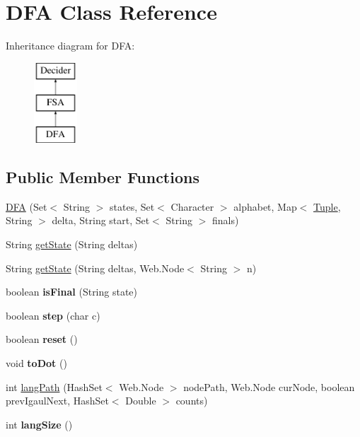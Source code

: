 \hypertarget{class_d_f_a}{}\section{D\+FA Class Reference}
\label{class_d_f_a}
Inheritance diagram for D\+FA\+:\begin{figure}[H]
\begin{center}
\leavevmode
\includegraphics[height=3.000000cm]{class_d_f_a}
\end{center}
\end{figure}
\subsection*{Public Member Functions}
\begin{DoxyCompactItemize}
\item 
\mbox{\hyperlink{class_d_f_a_a2dac22724db342b9f981318325f99f0e}{D\+FA}} (Set$<$ String $>$ states, Set$<$ Character $>$ alphabet, Map$<$ \mbox{\hyperlink{class_tuple}{Tuple}}, String $>$ delta, String start, Set$<$ String $>$ finals)
\item 
String \mbox{\hyperlink{class_d_f_a_a77e6a5e4aa6f18671a8e4534735ede72}{get\+State}} (String deltas)
\item 
String \mbox{\hyperlink{class_d_f_a_a3ed33d3f6ca27d723d8357c0aa44b362}{get\+State}} (String deltas, Web.\+Node$<$ String $>$ n)
\item 
\mbox{\label{class_d_f_a_ad565130d28a1ed9ddfbd4e3df6791e8a}} 
boolean {\bfseries is\+Final} (String state)
\item 
\mbox{\label{class_d_f_a_a676dcfeea9da5d2db9334d92de04854d}} 
boolean {\bfseries step} (char c)
\item 
\mbox{\label{class_d_f_a_af214bd9d0f7b409f51d9c75231a35d8a}} 
boolean {\bfseries reset} ()
\item 
\mbox{\label{class_d_f_a_a31a84e701857a6481cfe6d7d732b44c4}} 
void {\bfseries to\+Dot} ()
\item 
int \mbox{\hyperlink{class_d_f_a_abdddbd2717851483dfe7524f58a9487d}{lang\+Path}} (Hash\+Set$<$ Web.\+Node $>$ node\+Path, Web.\+Node cur\+Node, boolean prev\+Igaul\+Next, Hash\+Set$<$ Double $>$ counts)
\item 
\mbox{\label{class_d_f_a_a1bc60801cdf2ce0036c06f236edb74a0}} 
int {\bfseries lang\+Size} ()
\end{DoxyCompactItemize}
